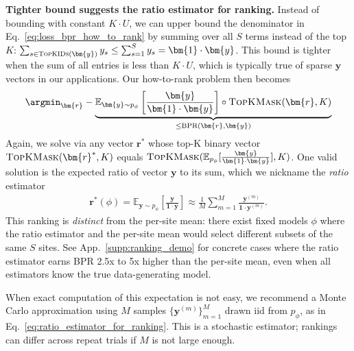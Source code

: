 \textbf{Tighter bound suggests the ratio estimator for ranking.} 
Instead of bounding with constant $K \cdot U$, we can upper bound the denominator in Eq.~\eqref{eq:loss_bpr_how_to_rank} by summing over all $S$ terms instead of the top $K$:
$\sum_{s \in \textsc{TopKIDs}(\bm{y})} y_s \leq \sum_{s=1}^S y_s = \bm{1} \cdot \bm{y}$. This bound is tighter when the sum of all entries is less than $K \cdot U$, which is typically true of sparse $\bm{y}$ vectors in our applications. Our how-to-rank problem then becomes
\begin{align}
    \argmin_{\bm{r}} - \underbrace{
    \mathbb{E}_{\bm{y} \sim p_{\phi}} \left[
    \frac{
    \bm{y} 
    }{
        \bm{1} \cdot \bm{y}
    }
    \right] \circ \textsc{TopKMask}( \bm{r}, K)
    }_{\leq \text{BPR}(\bm{r}, \bm{y})}
\end{align}
Again, we solve via any vector $\bm{r}^*$ whose top-K binary vector
$ \textsc{TopKMask}(\bm{r}^*, K)$ equals $\textsc{TopKMask}( \mathbb{E}_{p_{\phi}} [
    \frac{ \bm{y} }{\bm{1} \cdot \bm{y}}
    ], K )$.    
One valid solution is the expected ratio of vector $\bm{y}$ to its sum, which we nickname the \emph{ratio} estimator
\begin{align}
\label{eq:ratio_estimator_for_ranking}
\bm{r}^*(\phi) = \mathbb{E}_{\bm{y} \sim p_{\phi}}\left[ \frac{\bm{y}}{\bm{1} \cdot \bm{y}} \right]
\approx \frac{1}{M} \sum_{m=1}^M \frac{ \bm{y}^{(m)}}{ \bm{1}\cdot\bm{y}^{(m)} }.
\end{align}
This ranking is \emph{distinct} from the per-site mean: there exist fixed models $\phi$ where the ratio estimator and the per-site mean would select different subsets of the same $S$ sites. See App.~\ref{supp:ranking_demo} for concrete cases where the ratio estimator earns BPR 2.5x to 5x higher than the per-site mean, even when all estimators know the true data-generating model.

When exact computation of this expectation is not easy, we recommend a Monte Carlo approximation using $M$ samples $\{ \bm{y}^{(m)} \}_{m=1}^M$ drawn iid from $p_{\phi}$, as in Eq.~\eqref{eq:ratio_estimator_for_ranking}. 
This is a stochastic estimator; rankings can differ across repeat trials if $M$ is not large enough.

